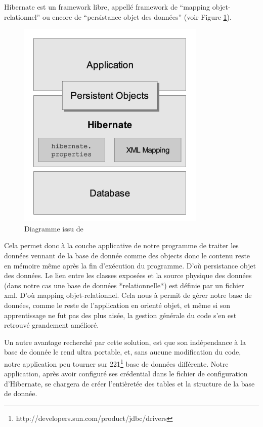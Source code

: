 Hibernate est un framework libre, appellé framework de  \enquote{mapping objet-relationnel} ou encore de \enquote{persistance objet des données} (voir Figure \ref{reference2}). 
\begin{figure}[!h]
    \center
   	\includegraphics[scale=0.65]{schema_hibernate.png}
   	\caption{Diagramme issu de\url{}}
    \label{reference2}
\end{figure}
Cela permet donc à la couche applicative de notre programme de traiter les données vennant de la base de donnée comme des objects donc le contenu reste en mémoire même après la fin d'exécution du programme. D'où persistance objet des données. Le lien entre les classes exposées et la source physique des données (dans notre cas une base de données *relationnelle*) est définie par un fichier xml. D'où mapping objet-relationnel.
Cela nous à permit de gérer notre base de données, comme le reste de l'application en orienté objet, et même si son apprentissage ne fut pas des plus aisée, la gestion générale du code s'en est retrouvé grandement amélioré.

Un autre avantage recherché par cette solution, est que son indépendance à la base de donnée le rend ultra portable, et, sans aucune modification du code, notre application peu tourner sur 221\footnote{http://developers.sun.com/product/jdbc/drivers} base de données différente.  Notre application, après avoir configuré ses crédential dans le fichier de configuration d'Hibernate, se chargera de créer l'entièretée des tables et la structure de la base de donnée.

